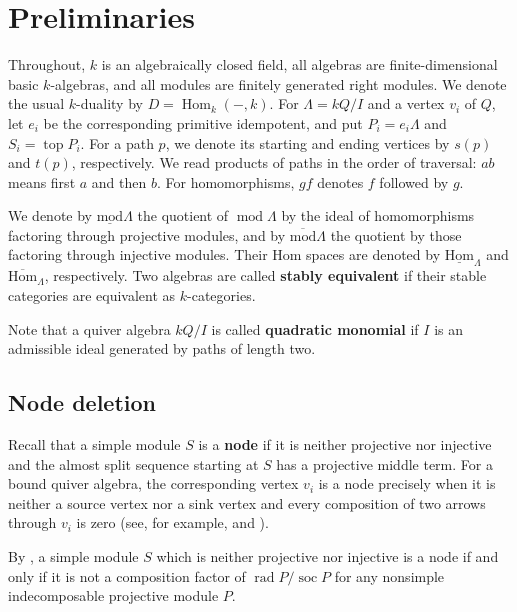 \documentclass[11pt]{article}
\newcommand{\soc}{\operatorname{soc}}
\newcommand{\rad}{\operatorname{rad}}
\renewcommand{\top}{\operatorname{top}}
\newcommand{\Hom}{\operatorname{Hom}}
\renewcommand{\mod}{\operatorname{mod}}
\newcommand{\smod}{\operatorname{\underline{mod}}}
\newcommand{\sHom}{\operatorname{\underline{Hom}}}
\newcommand{\ismod}{\operatorname{\overline{mod}}}
\newcommand{\isHom}{\operatorname{\overline{Hom}}}
\providecommand{\varLambda}{\Lambda}
\theoremstyle{definition}
\begin{document}
\section{Preliminaries}\label{section of preliminaries}

	Throughout, $k$ is an algebraically closed field, all algebras are finite-dimensional basic $k$-algebras, and all modules are finitely generated right modules.
	We denote the usual $k$-duality by $D=\Hom_k(-,k)$.
	For $\varLambda=kQ/I$ and a vertex $v_i$ of $Q$, let $e_i$ be the corresponding primitive idempotent, and put $P_i=e_i\varLambda$ and $S_i=\top P_i$.
	For a path $p$, we denote its starting and ending vertices by $s(p)$ and $t(p)$, respectively.
	We read products of paths in the order of traversal: $ab$ means first $a$ and then $b$.
	For homomorphisms, $gf$ denotes $f$ followed by $g$.

	{
		We denote by $\smod\varLambda$ the quotient of $\mod\varLambda$ by the ideal of homomorphisms factoring through projective modules, and by $\ismod\varLambda$ the quotient by those factoring through injective modules.
		Their Hom spaces are denoted by $\sHom_\varLambda$ and $\isHom_\varLambda$, respectively.
		Two algebras are called \textbf{stably equivalent} if their stable categories are equivalent as $k$-categories.
	}

	{
		Note that a quiver algebra $kQ/I$ is called \textbf{quadratic monomial} if $I$ is an admissible ideal generated by paths of length two.
	}

	\subsection{Node deletion}\label{subsection of node deletion}

		Recall that a simple module $S$ is a \textbf{node} if it is neither projective nor injective and the almost split sequence starting at $S$ has a projective middle term. For a bound quiver algebra, the corresponding vertex $v_i$ is a node precisely when it is neither a source vertex nor a sink vertex and every composition of two arrows through $v_i$ is zero (see, for example, \cite[Proposition~1.3]{Mar90} and \cite{MM05}).

		By \cite[Proposition~1.3(iii)]{Mar90}, a simple module $S$ which is neither projective nor injective is a node if and only if it is not a composition factor of $\rad P/\soc P$ for any nonsimple indecomposable projective module $P$.
        
\end{document}
